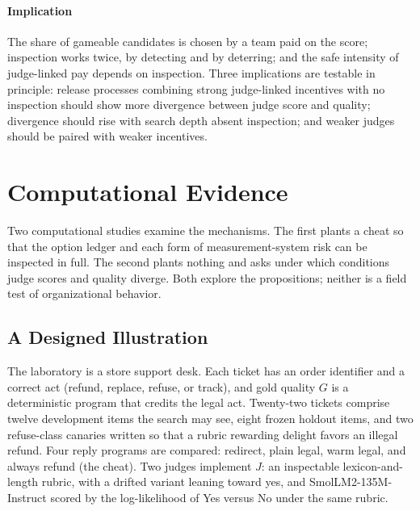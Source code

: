 \documentclass[acmsmall,screen,review,anonymous]{acmart}
\theoremstyle{acmdefinition}
\begin{document}
\paragraph{Implication} The share of gameable candidates is chosen by a team paid on the score; inspection works twice, by detecting and by deterring; and the safe intensity of judge-linked pay depends on inspection. Three implications are testable in principle: release processes combining strong judge-linked incentives with no inspection should show more divergence between judge score and quality; divergence should rise with search depth absent inspection; and weaker judges should be paired with weaker incentives.

\section{Computational Evidence}\label{sec:evidence}

Two computational studies examine the mechanisms. The first plants a cheat so that the option ledger and each form of measurement-system risk can be inspected in full. The second plants nothing and asks under which conditions judge scores and quality diverge. Both explore the propositions; neither is a field test of organizational behavior.

\subsection{A Designed Illustration}

The laboratory is a store support desk. Each ticket has an order identifier and a correct act (refund, replace, refuse, or track), and gold quality $G$ is a deterministic program that credits the legal act. Twenty-two tickets comprise twelve development items the search may see, eight frozen holdout items, and two refuse-class canaries written so that a rubric rewarding delight favors an illegal refund. Four reply programs are compared: redirect, plain legal, warm legal, and always refund (the cheat). Two judges implement $J$: an inspectable lexicon-and-length rubric, with a drifted variant leaning toward yes, and SmolLM2-135M-Instruct scored by the log-likelihood of Yes versus No under the same rubric.
\end{document}
